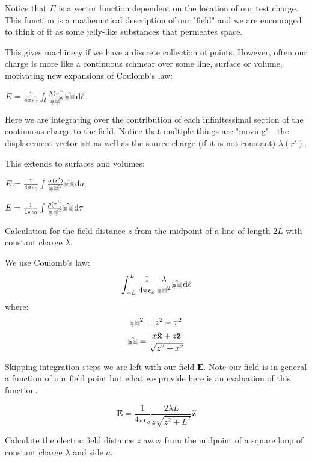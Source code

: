 \documentclass[10pt]{article}
\def\rcurs{{\mbox{$\resizebox{.16in}{.08in}{\texttt{[image: ScriptR]}}$}}}
\def\brcurs{{\mbox{$\resizebox{.16in}{.08in}{\texttt{[image: BoldR]}}$}}}
\def\hrcurs{{\mbox{$\hat \brcurs$}}}
\newcommand{\uvec}[1]{\boldsymbol{\hat{\textbf{#1}}}}
\begin{document}
Notice that $E$ is a vector function dependent on the location of our test
charge. This function is a mathematical description of our "field" and we are
encouraged to think of it as some jelly-like substances that permeates space.

This gives machinery if we have a discrete collection of points. However, often
our charge is more like a continuous schmear over some line, surface or volume,
motivating new expansions of Coulomb's law:

\begin{definition}
	$E = \frac 1 {4\pi\epsilon_0} \int_l \frac{\lambda(r')}{\rcurs^2} \hrcurs \dd \ell$
\end{definition}

Here we are integrating over the contribution of each infinitessimal section of
the continuous charge to the field. Notice that multiple things are "moving" - the
displacement vector $\rcurs$ as well as the source charge (if it is not
constant) $\lambda(r')$. 

This extends to surfaces and volumes:

\begin{definition}
	$E = \frac 1 {4\pi\epsilon_0} \int \frac{\sigma(r')}{\rcurs^2} \hrcurs \dd a$
\end{definition}

\begin{definition}
	$E = \frac 1 {4\pi\epsilon_0} \int \frac{\rho(r')}{\rcurs^2} \hrcurs \dd \tau$
\end{definition}

\begin{example}{2.2}
Calculation for the field distance $z$ from the midpoint of a line of length $2L$ with constant charge $\lambda$.

We use Coulomb's law:
	\[
		\int_{-L}^{L} \frac 1{4\pi\epsilon_o} \frac{\lambda}{\rcurs^2} \hrcurs \dd \ell
	\]
where:
\[ \rcurs^2 = z^2 + x^2\]
\[ \hrcurs = \frac{x\uvec{x} + z\uvec{z}}{\sqrt{z^2 + x^2}} \]
\end{example}
\indent Skipping integration steps we are left with our field $\boldsymbol{E}$. Note our field is in general a function of our field point but what we provide here is an evaluation of this function.

\[
	\boldsymbol{E} = \frac 1{4\pi\epsilon_o} \frac{2\lambda L}{z \sqrt{z^2 + L^2}} \uvec{z}
\]

\begin{exercise}[2.4]
	Calculate the electric field distance $z$ away from the midpoint of a square loop of constant charge $\lambda$ and side $a$.
\end{exercise}
\end{document}

